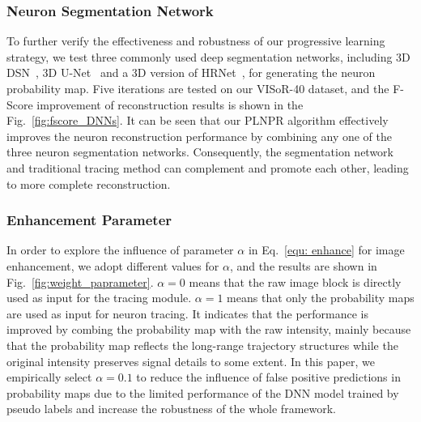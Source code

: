 \subsubsection{Neuron Segmentation Network}

To further verify the effectiveness and robustness of our progressive learning strategy, we test three commonly used deep segmentation networks, including 3D DSN~\cite{Dou2017}, 3D U-Net~\cite{Cicek2016} and a 3D version of HRNet~\cite{Sun2019}, for generating the neuron probability map.
Five iterations are tested on our VISoR-40 dataset, and the F-Score improvement of reconstruction results is shown in the Fig.~\ref{fig:fscore_DNNs}. 
%
It can be seen that our PLNPR algorithm effectively improves the neuron reconstruction performance by combining any one of the three neuron segmentation networks.
Consequently, the segmentation network and traditional tracing method can complement and promote each other, leading to more complete reconstruction.


\subsubsection{Enhancement Parameter} 

In order to explore the influence of parameter $\alpha$ in Eq.~\eqref{equ: enhance} for image enhancement, we adopt different values for $\alpha$, and the results are shown in Fig.~\ref{fig:weight_paprameter}.
$\alpha=0$ means that the raw image block is directly used as input for the tracing module.
$\alpha=1$ means that only the probability maps are used as input for neuron tracing. 
It indicates that the performance is improved by combing the probability map with the raw intensity, mainly because that the probability map reflects the long-range trajectory structures while the original intensity preserves signal details to some extent.
In this paper, we empirically select $\alpha=0.1$ to reduce the influence of false positive predictions in probability maps due to the limited performance of the DNN model trained by pseudo labels and increase the robustness of the whole framework.

